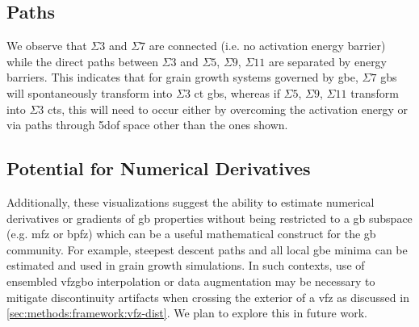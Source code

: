 \documentclass[final,twocolumn,12pt]{elsarticle}
\begin{document}
    \subsection{ Paths} \label{sec:discuss:path}
	 We observe that $\Sigma3$ and $\Sigma7$ are connected (i.e. no activation energy barrier) while the direct paths between $\Sigma3$ and $\Sigma5$, $\Sigma9$, $\Sigma11$ are separated by energy barriers. This indicates that for grain growth systems governed by \gls{gbe}, $\Sigma7$ \glspl{gb} will spontaneously transform into $\Sigma3$ \gls{ct} \glspl{gb}, whereas if $\Sigma5$, $\Sigma9$, $\Sigma11$ transform into $\Sigma3$ \glspl{ct}, this will need to occur either by overcoming the activation energy or via paths through \gls{5dof} space other than the ones shown.
	 
	 \subsection{Potential for Numerical Derivatives}
	\label{sec:discuss:deriv}
	
	Additionally, these visualizations suggest the ability to estimate numerical derivatives or gradients of \gls{gb} properties without being restricted to a \gls{gb} subspace (e.g. \gls{mfz} or \gls{bpfz}) which can be a useful mathematical construct for the \gls{gb} community. For example, steepest descent paths and all local \gls{gbe} minima can be estimated and used in grain growth simulations. In such contexts, use of ensembled \gls{vfzgbo} interpolation or data augmentation may be necessary to mitigate discontinuity artifacts when crossing the exterior of a \gls{vfz} as discussed in \cref{sec:methods:framework:vfz-dist}. We plan to explore this in future work.
	
\end{document}

